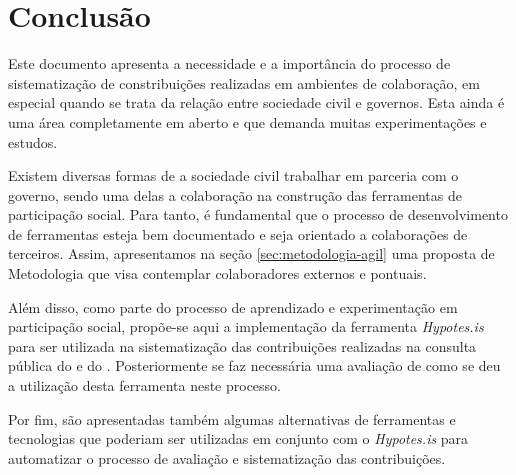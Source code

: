 \chapter{Conclusão}
Este documento apresenta a necessidade e a importância do processo de sistematização de constribuições realizadas em ambientes de colaboração, em especial quando se trata da relação entre sociedade civil e governos. Esta ainda é uma área completamente em aberto e que demanda muitas experimentações e estudos.

Existem diversas formas de a sociedade civil trabalhar em parceria com o governo, sendo uma delas a colaboração na construção das ferramentas de participação social. Para tanto, é fundamental que o processo de desenvolvimento de ferramentas esteja bem documentado e seja orientado a colaborações de terceiros. Assim, apresentamos na seção \ref{sec:metodologia-agil} uma proposta de Metodologia que visa contemplar colaboradores externos e pontuais.

Além disso, como parte do processo de aprendizado e experimentação em participação social, propõe-se aqui a implementação da ferramenta \textit{Hypotes.is} para ser utilizada na sistematização das contribuições realizadas na consulta pública do \mc e do \pdp. Posteriormente se faz necessária uma avaliação de como se deu a utilização desta ferramenta neste processo.

Por fim, são apresentadas também algumas alternativas de ferramentas e tecnologias que poderiam ser utilizadas em conjunto com o \textit{Hypotes.is} para automatizar o processo de avaliação e sistematização das contribuições.
